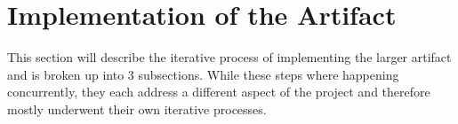 \section{Implementation of the Artifact}

This section will describe the iterative process of implementing the larger artifact and is broken up into 3 subsections.
While these steps where happening concurrently, they each address a different aspect of the project and therefore mostly underwent their own iterative processes.








